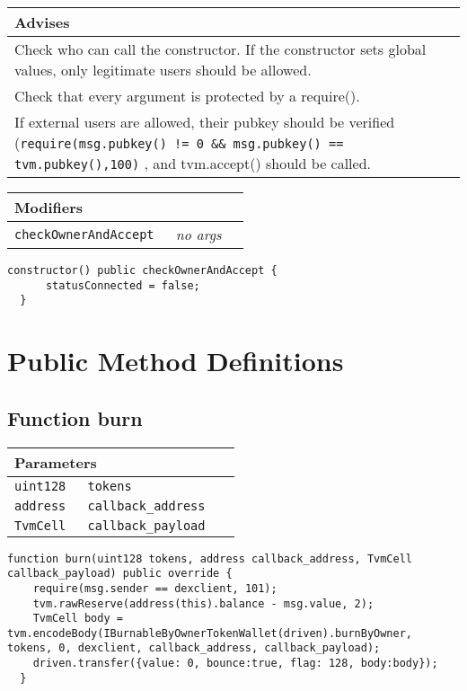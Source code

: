 \ifsoldraft
\noindent\begin{tabular}{|p{12cm}|}\hline
\rowcolor{green}Advises
\\\hline
Check who can call the constructor. If the constructor sets global values, only legitimate users should be allowed.
\\\hline
Check that every argument is protected by a require().
\\\hline
If external users are allowed, their pubkey should be verified (\verb+require(msg.pubkey() != 0 && msg.pubkey() == tvm.pubkey(),100)+ , and tvm.accept() should be called.
\\\hline\end{tabular}
\fi

\ifsoltables
\noindent\begin{tabular}{|l|l|p{5cm}|}\hline
\multicolumn{3}{|l|}{\bf Modifiers}\\\hline
\tt checkOwnerAndAccept & {\em no args} &\\\hline
\end{tabular}
\fi

\vspace{2cm}

\begin{lstlisting}[firstnumber=39]
  constructor() public checkOwnerAndAccept {
      statusConnected = false;
  }
\end{lstlisting}

\section{Public Method Definitions}


\subsection{Function burn}


\ifsoltables
\noindent\begin{tabular}{|l|l|p{5cm}|}\hline
\multicolumn{3}{|l|}{\bf Parameters}\\\hline
\tt uint128 & \tt tokens &\\\hline
\tt address & \tt callback\_{}address &\\\hline
\tt TvmCell & \tt callback\_{}payload &\\\hline
\end{tabular}
\fi

\vspace{2cm}

\begin{lstlisting}[firstnumber=116]
  function burn(uint128 tokens, address callback_address, TvmCell callback_payload) public override {
    require(msg.sender == dexclient, 101);
    tvm.rawReserve(address(this).balance - msg.value, 2);
    TvmCell body = tvm.encodeBody(IBurnableByOwnerTokenWallet(driven).burnByOwner, tokens, 0, dexclient, callback_address, callback_payload);
    driven.transfer({value: 0, bounce:true, flag: 128, body:body});
  }
\end{lstlisting}

